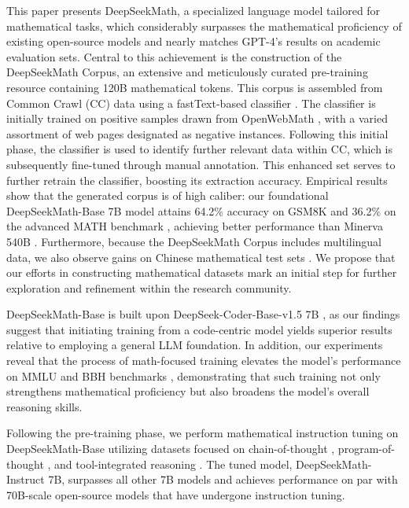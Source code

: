 This paper presents DeepSeekMath, a specialized language model tailored for mathematical tasks, which considerably surpasses the mathematical proficiency of existing open-source models and nearly matches GPT-4’s results on academic evaluation sets. Central to this achievement is the construction of the DeepSeekMath Corpus, an extensive and meticulously curated pre-training resource containing 120B mathematical tokens. This corpus is assembled from Common Crawl (CC) data using a fastText-based classifier \citep{joulin2016fasttext}. The classifier is initially trained on positive samples drawn from OpenWebMath \citep{openwebmath}, with a varied assortment of web pages designated as negative instances. Following this initial phase, the classifier is used to identify further relevant data within CC, which is subsequently fine-tuned through manual annotation. This enhanced set serves to further retrain the classifier, boosting its extraction accuracy. Empirical results show that the generated corpus is of high caliber: our foundational DeepSeekMath-Base 7B model attains 64.2\% accuracy on GSM8K \citep{gsm8k} and 36.2\% on the advanced MATH benchmark \citep{MATH}, achieving better performance than Minerva 540B \citep{minerva}. Furthermore, because the DeepSeekMath Corpus includes multilingual data, we also observe gains on Chinese mathematical test sets \citep{wei2023cmath,agieval}. We propose that our efforts in constructing mathematical datasets mark an initial step for further exploration and refinement within the research community.

DeepSeekMath-Base is built upon DeepSeek-Coder-Base-v1.5 7B \citep{deepseek-coder}, as our findings suggest that initiating training from a code-centric model yields superior results relative to employing a general LLM foundation. In addition, our experiments reveal that the process of math-focused training elevates the model's performance on MMLU \citep{mmlu} and BBH benchmarks \citep{bbh}, demonstrating that such training not only strengthens mathematical proficiency but also broadens the model’s overall reasoning skills.

Following the pre-training phase, we perform mathematical instruction tuning on DeepSeekMath-Base utilizing datasets focused on chain-of-thought \citep{cot}, program-of-thought \citep{pot,pal}, and tool-integrated reasoning \citep{tora}. The tuned model, DeepSeekMath-Instruct 7B, surpasses all other 7B models and achieves performance on par with 70B-scale open-source models that have undergone instruction tuning.


